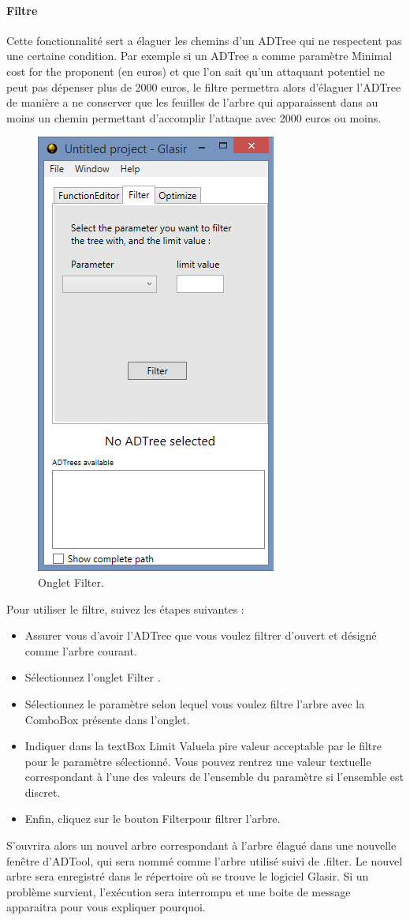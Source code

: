 \paragraph{Filtre}Cette fonctionnalité sert a élaguer les chemins d'un ADTree qui ne respectent pas une certaine condition. Par exemple si un ADTree a comme paramètre \og Minimal cost for the proponent \fg (en euros) et que l'on sait qu'un attaquant potentiel ne peut pas dépenser plus de 2000 euros, le filtre permettra alors d'élaguer l'ADTree de manière a ne conserver que les feuilles de l'arbre qui apparaissent dans au moins un chemin permettant d'accomplir l'attaque avec 2000 euros ou moins.

 \begin{figure}[!h]
        \centering
        \includegraphics[height=0.7\textwidth]{figure/filter.png}
        \caption{Onglet Filter.}
        \label{fig:filter}
    \end{figure}

Pour utiliser le filtre, suivez les étapes suivantes :

\begin{itemize}
\item Assurer vous d'avoir l'ADTree que vous voulez filtrer d'ouvert et désigné comme l'arbre courant. 
\item Sélectionnez l'onglet \og Filter \fg .
\item Sélectionnez le paramètre selon lequel vous voulez filtre l'arbre avec la ComboBox présente dans l'onglet.
\item Indiquer dans la textBox \og Limit Value\fg la pire valeur acceptable par le filtre pour le paramètre sélectionné. Vous pouvez rentrez une valeur textuelle correspondant à l'une des valeurs de l'ensemble du paramètre si l'ensemble est discret.
\item Enfin, cliquez sur le bouton \og Filter\fg pour filtrer l'arbre.
\end{itemize}
S'ouvrira alors un nouvel arbre correspondant à l'arbre élagué dans une nouvelle fenêtre d'ADTool, qui sera nommé comme l'arbre utilisé suivi de \og .filter\fg . Le nouvel arbre sera enregistré dans le répertoire où se trouve le logiciel Glasir.
Si un problème survient, l'exécution sera interrompu et une boite de message apparaitra pour vous expliquer pourquoi.

